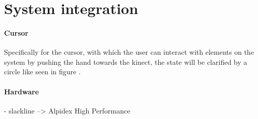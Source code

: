 \chapter{System integration}

\subsubsection{Cursor}
Specifically for the cursor, with which the user can interact with elements on the system by pushing the hand towards the kinect, the state will be clarified by a circle like seen in figure .

\subsubsection{Hardware}
- slackline --> Alpidex High Performance

 